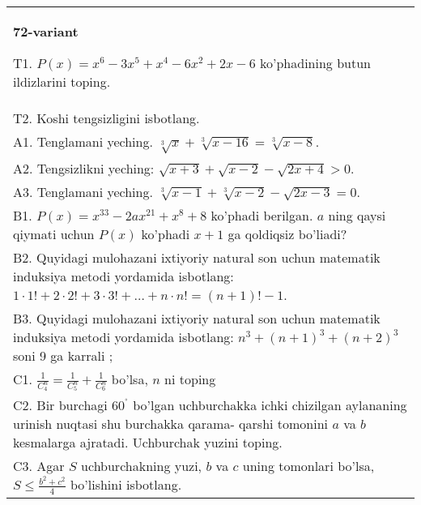 \documentclass{article}
\begin{document}
\begin{tabular}{m{17cm}}
\textbf{72-variant}
\newline

T1. \(P(x) = x^{6} - 3x^{5} + x^{4} - 6x^{2} + 2x - 6\) ko'phadining butun ildizlarini toping. \\
T2. Koshi tengsizligini isbotlang. \\
A1. Tenglamani yeching. \(\sqrt[3]{x} + \sqrt[3]{x - 16} = \sqrt[3]{x - 8}\). \\
A2. Tengsizlikni yeching: \(\sqrt{x + 3} + \sqrt{x - 2} - \sqrt{2x + 4} > 0\). \\
A3. Tenglamani yeching. \(\sqrt[3]{x - 1} + \sqrt[3]{x - 2} - \sqrt{2x - 3} = 0\). \\
B1. \(P(x) = x^{33} - 2ax^{21} + x^{8} + 8\) ko'phadi berilgan. \(a\) ning qaysi qiymati uchun \(P(x)\) ko'phadi \(x + 1\) ga qoldiqsiz bo'liadi? \\
B2. Quyidagi mulohazani ixtiyoriy natural son uchun matematik induksiya metodi yordamida isbotlang: \(1 \cdot 1! + 2 \cdot 2! + 3 \cdot 3! + \ldots + n \cdot n! = (n + 1)! - 1\). \\
B3. Quyidagi mulohazani ixtiyoriy natural son uchun matematik induksiya metodi yordamida isbotlang: \(n^{3} + (n + 1)^{3} + (n + 2)^{3}\) soni 9 ga karrali ; \\
C1. \(\frac{1}{C_{4}^{n}} = \frac{1}{C_{5}^{n}} + \frac{1}{C_{6}^{n}}\) bo'lsa, \(n\) ni toping \\
C2. Bir burchagi \(60^{{^\circ}}\) bo'lgan uchburchakka ichki chizilgan aylananing urinish nuqtasi shu burchakka qarama- qarshi tomonini \(a\) va \(b\) kesmalarga ajratadi. Uchburchak yuzini toping. \\
C3. Agar \(S\) uchburchakning yuzi, \(b\) va \(c\) uning tomonlari bo'lsa, \(S \leq \frac{b^{2} + c^{2}}{4}\) bo'lishini isbotlang. \\

\end{tabular}
\vspace{1cm}
\end{document}
